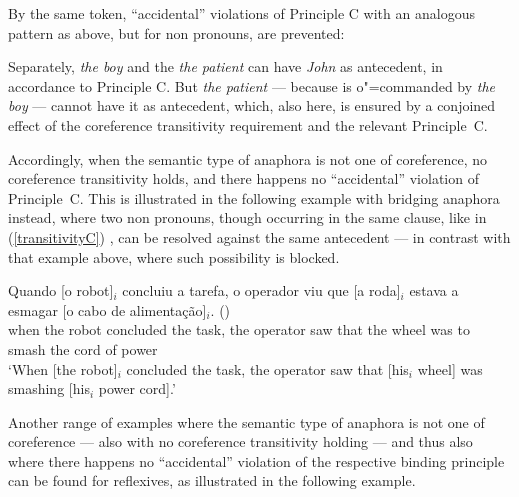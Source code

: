 \documentclass[output=paper
,modfonts
,nonflat]{langsci/langscibook}
\begin{document}
By the same token, ``accidental'' violations of Principle C 
with an analogous pattern as above, but for non pronouns, are prevented:

 \begin{exe}
\label{transitivityC}
\end{exe}

Separately, \emph{the boy} and the \emph{the patient} can have \emph{John} as antecedent, in accordance
to Principle C. 
But \emph{the patient} --- because is o"=commanded by \emph{the boy} --- cannot have it as antecedent, 
which, also here, is ensured by a conjoined 
effect of the coreference transitivity requirement and the relevant Principle~C.

Accordingly, when the semantic type of anaphora is not one of coreference,
no coreference transitivity holds, and there happens no ``accidental'' violation of Principle~C.
This is illustrated in the following example with bridging anaphora instead,
where two non pronouns, though occurring in the same clause, like in (\ref{transitivityC}) , can be resolved against 
the same antecedent --- in contrast with that example above, where such possibility is blocked.

\begin{exe}
\ex
\gll Quando [o robot]$_{i}$ concluiu a tarefa, o operador viu que [a roda]$_{i}$ estava a esmagar [o cabo de alimenta\c{c}\~ao]$_{i}$. ()\\ 
when the robot concluded the task, the operator saw that the wheel was to smash the cord of power\\
\trans `When [the robot]$_{i}$ concluded the task, the operator saw that [his$_{i}$ wheel] was smashing [his$_{i}$ power cord].'
\end{exe}

Another range of examples where the semantic type of anaphora is not one of coreference --- also with
no coreference transitivity holding --- and thus also where there happens no ``accidental'' violation
of the respective binding principle can be found for reflexives, as illustrated in the following example.

 \begin{exe}
 \label{accidentalReflexives}
\end{exe}
\end{document}
